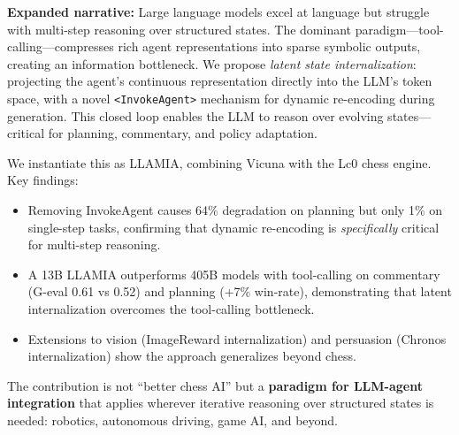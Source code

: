 \textbf{Expanded narrative:}
Large language models excel at language but struggle with multi-step reasoning over structured states. The dominant paradigm—tool-calling—compresses rich agent representations into sparse symbolic outputs, creating an information bottleneck. We propose \textit{latent state internalization}: projecting the agent's continuous representation directly into the LLM's token space, with a novel \texttt{<InvokeAgent>} mechanism for dynamic re-encoding during generation. This closed loop enables the LLM to reason over evolving states—critical for planning, commentary, and policy adaptation.

We instantiate this as LLAMIA, combining Vicuna with the Lc0 chess engine. Key findings:
\begin{itemize}[leftmargin=*, itemsep=1pt]
    \item Removing InvokeAgent causes 64\% degradation on planning but only 1\% on single-step tasks, confirming that dynamic re-encoding is \textit{specifically} critical for multi-step reasoning.
    \item A 13B LLAMIA outperforms 405B models with tool-calling on commentary (G-eval 0.61 vs 0.52) and planning (+7\% win-rate), demonstrating that latent internalization overcomes the tool-calling bottleneck.
    \item Extensions to vision (ImageReward internalization) and persuasion (Chronos internalization) show the approach generalizes beyond chess.
\end{itemize}

The contribution is not ``better chess AI'' but a \textbf{paradigm for LLM-agent integration} that applies wherever iterative reasoning over structured states is needed: robotics, autonomous driving, game AI, and beyond.

